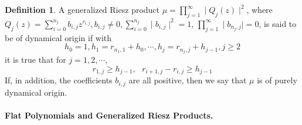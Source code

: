 \documentclass{amsart}
\theoremstyle{definition}
\newtheorem{Def}[Th]{Definition}
\theoremstyle{remark}
\numberwithin{equation}{section}
\newcommand{\1}{\mathbb{1}}
\begin{document}
\begin{Def}\label{def1}
 A generalized Riesz product $\mu = \prod_{j=1}^\infty\mid Q_j(z)\mid^2$,
where $Q_j(z) = \sum_{i=0}^{n_j} b_{i,j}z^{r_{i,j}}, b_{i,j} \neq 0, \sum_{i=0}^{n_j}\mid b_{i,j}\mid^2 =1$, $\prod_{j=1}^\infty\mid b_{n_j, j}\mid =0$, is said to be of dynamical origin if
 with $$h_0 = 1, h_1 = r_{n_1,1} +h_0, \cdots , h_j = r_{n_j,j} +h_{j-1}, j \geq 2$$
it is true that for  $j=1,2,\cdots$,
$$r_{1,j} \geq h_{j-1}, ~~~r_{i+1,j} - r_{i,j} \geq h_{j-1}$$
If, in addition, the coefficients $b_{i,j}$ are all positive, then we say that $\mu$ is of purely dynamical origin.\\
\end{Def}

 \paragraph{\textbf{Flat Polynomials and Generalized Riesz Products.}}
\end{document}
